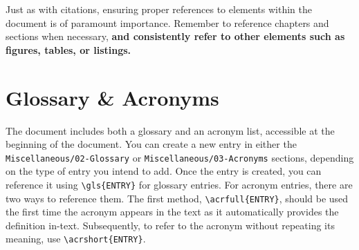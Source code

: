 \begin{importantbox}
Just as with citations, ensuring proper references to elements within the document is of paramount importance. Remember to reference chapters and sections when necessary, \textbf{and consistently refer to other elements such as figures, tables, or listings.}
\end{importantbox}

\section{Glossary \& Acronyms}
The document includes both a glossary and an acronym list, accessible at the beginning of the document. You can create a new entry in either the \verb|Miscellaneous/02-Glossary| or \verb|Miscellaneous/03-Acronyms| sections, depending on the type of entry you intend to add. Once the entry is created, you can reference it using \verb|\gls{ENTRY}| for glossary entries. For acronym entries, there are two ways to reference them. The first method, \verb|\acrfull{ENTRY}|, should be used the first time the acronym appears in the text as it automatically provides the definition in-text. Subsequently, to refer to the acronym without repeating its meaning, use \verb|\acrshort{ENTRY}|.

